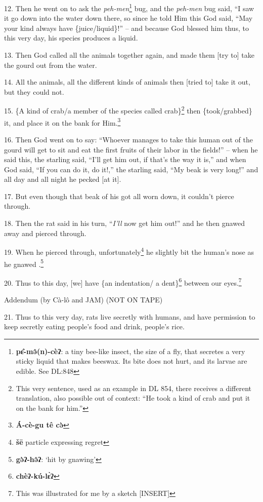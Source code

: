 12. Then he went on to ask the \textit{peh-men}\footnote{\textbf{pɛ̂-mə̂(n)-cèʔ}: a tiny bee-like insect, the size of a fly, that secretes a very sticky liquid that makes beeswax. Its bite does not hurt, and its larvae are edible. See DL:848} bug, and the \textit{peh-men}
bug said, ``I saw it go down into the water down there, so since he told Him this
God said, ``May your kind always have \{juice/liquid\}!'' -- and because God blessed
him thus, to this very day, his species produces a liquid.

13. Then God called all the animals together again, and made them [try to] take
the gourd out from the water.

14. All the animals, all the different kinds of animals then [tried to] take it
out, but they could not.

15. \{A kind of crab/a member of the species called crab\}\footnote{This very sentence, used as an example in DL 854, there receives a different translation, also possible out of context: ``He took a kind of crab and put it on the bank for him.''} then \{took/grabbed\}
it, and place it on the bank for Him.\footnote{\textbf{Á-cè-gu tê cə̀}}

16. Then God went on to say: ``Whoever manages to take this human out of the gourd
will get to sit and eat the first fruits of their labor in the fields!'' -- when
he said this, the starling said, ``I'll get him out, if that's the way it is,''
and when God said, ``If you can do it, do it!,'' the starling said, ``My beak is
very long!'' and all day and all night he pecked [at it].

17. But even though that beak of his got all worn down, it couldn't pierce through.

18. Then the rat said in his turn, ``\textit{I'll} now get him out!'' and he then
gnawed away and pierced through.

19. When he pierced through, unfortunately\footnote{\textbf{šē} particle expressing regret} he slightly bit the human's nose
as he gnawed .\footnote{\textbf{gə̀ʔ-hə̂ʔ}: `hit by gnawing'}

20. Thus to this day, [we] have \{an indentation/ a dent\}\footnote{\textbf{chèʔ-kú-lɛ̀ʔ}} between our eyes.\footnote{This was illustrated for me by a sketch [INSERT]}

Addendum (by Cà-lô and JAM) (NOT ON TAPE)

21. Thus to this very day, rats live secretly with humans, and have permission
to keep secretly eating people's food and drink, people's rice.

